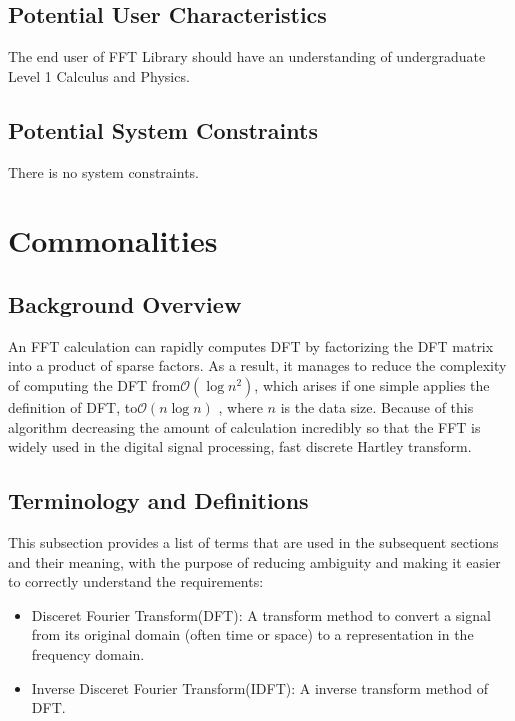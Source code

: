 \documentclass[12pt]{article}
\newcommand{\famname}{FFT} %
\begin{document}
\subsection{Potential User Characteristics} \label{SecUserCharacteristics}

The end user of \famname{} Library should have an understanding of undergraduate Level
1 Calculus and Physics.

\subsection{Potential System Constraints}
There is no system constraints.

\section{Commonalities}

\subsection{Background Overview} \label{Sec_Background}
An FFT calculation can rapidly computes DFT by factorizing the DFT matrix into a product of
sparse factors. As a result, it manages to reduce the complexity of computing
the DFT from$\mathcal{O}(\log{}n^2)$, which arises if one simple applies the
definition of
DFT, to$\mathcal{O}(n\log{}n)$ , where $\mathcal{}n$ is the data size. Because
of this
algorithm decreasing the amount of calculation incredibly so that the FFT is
widely used in the digital signal processing, fast discrete Hartley
transform.

\subsection{Terminology and  Definitions}

This subsection provides a list of terms that are used in the subsequent
sections and their meaning, with the purpose of reducing ambiguity and making it
easier to correctly understand the requirements:

\begin{itemize}
\item Disceret Fourier Transform(DFT): A transform method to convert a signal from its original domain (often time or space) to a representation in the frequency domain.
\end{itemize}

\begin{itemize}
\item Inverse Disceret Fourier Transform(IDFT): A inverse transform method of DFT. 
\end{itemize}
\end{document}
